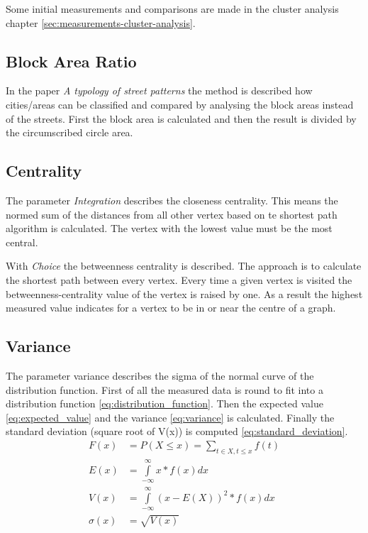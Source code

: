 Some initial measurements and comparisons are made in the cluster analysis chapter \ref{sec:measurements-cluster-analysis}.

\subsection{Block Area Ratio}
In the paper \textit{A typology of street patterns}\citep{blockArea:2014} the method is described how cities/areas can be classified and compared by analysing the block areas instead of the streets. First the block area is calculated and then the result is divided by the circumscribed circle area.

\subsection{Centrality}
The parameter \textit{Integration} describes the closeness centrality. This means the normed sum of the distances from all other vertex based on te shortest path algorithm is calculated. The vertex with the lowest value must be the most central.

With \textit{Choice} the betweenness centrality is described. The approach is to calculate the shortest path between every vertex. Every time a given vertex is visited the betweenness-centrality value of the vertex is raised by one. As a result the highest measured value indicates for a vertex to be in or near the centre of a graph.

\subsection{Variance}
The parameter variance describes the sigma of the normal curve of the distribution function.
First of all the measured data is round to fit into a distribution function \ref{eq:distribution_function}. Then the expected value \ref{eq:expected_value} and the variance \ref{eq:variance} is calculated. Finally the standard deviation (square root of V(x)) is computed \ref{eq:standard_deviation}.
\begin{align}
\label{eq:distribution_function} 
F(x) &= P(X \leq x) =  \sum_{t\in{X}, t\leq{x}}{f(t)} \\
\label{eq:expected_value} 
E(x) &= \int\limits_{-\infty}^\infty x * f(x)dx \\
\label{eq:variance} 
V(x) &= \int\limits_{-\infty}^\infty (x - E(X))^2 * f(x)dx \\
\label{eq:standard_deviation} 
\sigma(x) &= \sqrt{V(x)}
\end{align}


